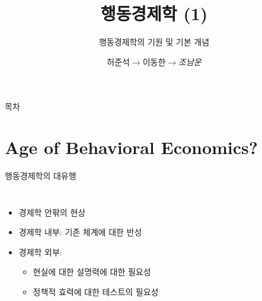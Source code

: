 \documentclass[final]{beamer}
\title{행동경제학 (1)}
\subtitle{행동경제학의 기원 및 기본 개념}
\author[조남운]{허준석$\rightarrow$이동한$\rightarrow$\emph{조남운}\\\mail}
\begin{document}
	
\begin{frame}[t]{}
	\maketitle
\end{frame}

\begin{frame}[t]{목차}
	\tableofcontents
\end{frame}

\section{Age of Behavioral Economics?} %
\label{sec:age_of_behavioral_economics}

\begin{frame}[t]{행동경제학의 대유행}
	\begin{columns}
		\begin{itemize}
			\item 경제학 안팎의 현상
			\item 경제학 내부: 기존 체계에 대한 반성
			\item 경제학 외부: 
			\begin{itemize}
				\item 현실에 대한 설명력에 대한 필요성
				\item 정책적 효력에 대한 테스트의 필요성
			\end{itemize}
		\end{itemize}
	\end{columns}
\end{frame}
\end{document}
